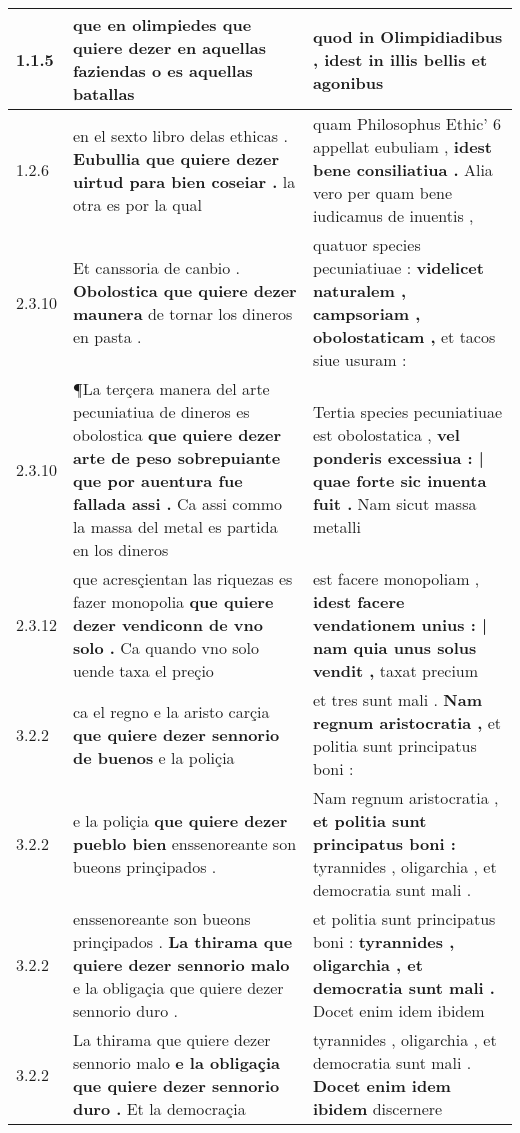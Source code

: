 \begin{tabular}{|p{1cm}|p{6.5cm}|p{6.5cm}|}

\hline
1.1.5 & que en olimpiedes \textbf{ que quiere dezer en aquellas faziendas } o es aquellas batallas & quod in Olimpidiadibus , \textbf{ idest in illis bellis } et agonibus \\\hline
1.2.6 & en el sexto libro delas ethicas . \textbf{ Eubullia que quiere dezer uirtud para bien coseiar . } la otra es por la qual & quam Philosophus Ethic’ 6 appellat eubuliam , \textbf{ idest bene consiliatiua . } Alia vero per quam bene iudicamus de inuentis , \\\hline
2.3.10 & Et canssoria de canbio . \textbf{ Obolostica que quiere dezer maunera } de tornar los dineros en pasta . & quatuor species pecuniatiuae : \textbf{ videlicet naturalem , campsoriam , obolostaticam , } et tacos siue usuram : \\\hline
2.3.10 & ¶La terçera manera del arte pecuniatiua de dineros es obolostica \textbf{ que quiere dezer arte de peso sobrepuiante que por auentura fue fallada assi . } Ca assi commo la massa del metal es partida en los dineros & Tertia species pecuniatiuae est obolostatica , \textbf{ vel ponderis excessiua : | quae forte sic inuenta fuit . } Nam sicut massa metalli \\\hline
2.3.12 & que acresçientan las riquezas es fazer monopolia \textbf{ que quiere dezer vendiconn de vno solo . } Ca quando vno solo uende taxa el preçio & est facere monopoliam , \textbf{ idest facere vendationem unius : | nam quia unus solus vendit , } taxat precium \\\hline
3.2.2 & ca el regno e la aristo carçia \textbf{ que quiere dezer sennorio de buenos } e la poliçia & et tres sunt mali . \textbf{ Nam regnum aristocratia , } et politia sunt principatus boni : \\\hline
3.2.2 & e la poliçia \textbf{ que quiere dezer pueblo bien } enssenoreante son bueons prinçipados . & Nam regnum aristocratia , \textbf{ et politia sunt principatus boni : } tyrannides , oligarchia , et democratia sunt mali . \\\hline
3.2.2 & enssenoreante son bueons prinçipados . \textbf{ La thirama que quiere dezer sennorio malo } e la obligaçia que quiere dezer sennorio duro . & et politia sunt principatus boni : \textbf{ tyrannides , oligarchia , et democratia sunt mali . } Docet enim idem ibidem \\\hline
3.2.2 & La thirama que quiere dezer sennorio malo \textbf{ e la obligaçia que quiere dezer sennorio duro . } Et la democraçia & tyrannides , oligarchia , et democratia sunt mali . \textbf{ Docet enim idem ibidem } discernere \\\hline

\end{tabular}
